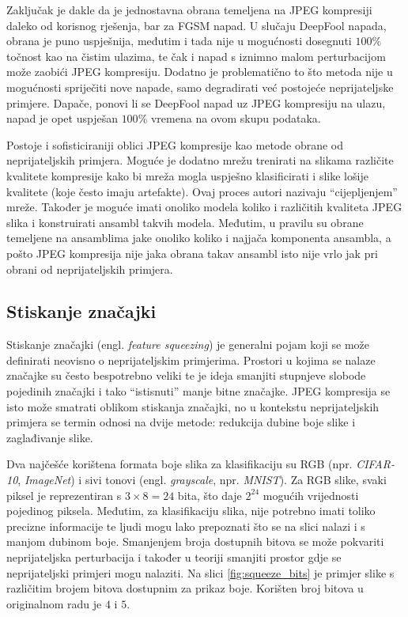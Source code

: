 \documentclass[utf8, diplomski]{fer}
\begin{document}
Zaključak je dakle da je jednostavna obrana temeljena na JPEG kompresiji daleko od korisnog rješenja, bar za FGSM napad. U slučaju DeepFool napada, obrana je puno uspješnija, međutim i tada nije u mogućnosti dosegnuti $100\%$ točnost kao na čistim ulazima, te čak i napad s iznimno malom perturbacijom može zaobići JPEG kompresiju. Dodatno je problematično to što metoda nije u mogućnosti spriječiti nove napade, samo degradirati već postojeće neprijateljske primjere. Dapače, ponovi li se DeepFool napad uz JPEG kompresiju na ulazu, napad je opet uspješan $100\%$ vremena na ovom skupu podataka.
\par
Postoje i sofisticiraniji oblici JPEG kompresije kao metode obrane\citep{jpeg2} od neprijateljskih primjera. Moguće je dodatno mrežu trenirati na slikama različite kvalitete kompresije kako bi mreža mogla uspješno klasificirati i slike lošije kvalitete (koje često imaju artefakte). Ovaj proces autori nazivaju ``cijepljenjem'' mreže. Također je moguće imati onoliko modela koliko i različitih kvaliteta JPEG slika i konstruirati ansambl takvih modela. Međutim, u pravilu su obrane temeljene na ansamblima jake onoliko koliko i najjača komponenta ansambla, a pošto JPEG kompresija nije jaka obrana takav ansambl isto nije vrlo jak pri obrani od neprijateljskih primjera.

\subsection{Stiskanje značajki}
Stiskanje značajki\citep{squeezing} (engl. \textit{feature squeezing}) je generalni pojam koji se može definirati neovisno o neprijateljskim primjerima. Prostori u kojima se nalaze značajke su često bespotrebno veliki te je ideja smanjiti stupnjeve slobode pojedinih značajki i tako ``istisnuti'' manje bitne značajke. JPEG kompresija se isto može smatrati oblikom stiskanja značajki, no u kontekstu neprijateljskih primjera se termin odnosi na dvije metode: redukcija dubine boje slike i zaglađivanje slike. \par
Dva najčešće korištena formata boje slika za klasifikaciju su RGB (npr. \textit{CIFAR-10}, \textit{ImageNet}) i sivi tonovi (engl. \textit{grayscale}, npr. \textit{MNIST}). Za RGB slike, svaki piksel je reprezentiran s $3 \times 8 = 24$ bita, što daje $2^{24}$ mogućih vrijednosti pojedinog piksela. Međutim, za klasifikaciju slika, nije potrebno imati toliko precizne informacije te ljudi mogu lako prepoznati što se na slici nalazi i s manjom dubinom boje. Smanjenjem broja dostupnih bitova se može pokvariti neprijateljska perturbacija i također u teoriji smanjiti prostor gdje se neprijateljski primjeri mogu nalaziti. Na slici \ref{fig:squeeze_bits} je primjer slike s različitim brojem bitova dostupnim za prikaz boje. Korišten broj bitova u originalnom radu je $4$ i $5$.
\end{document}
